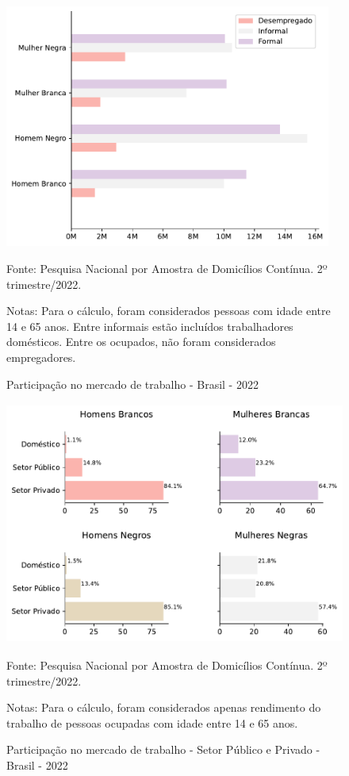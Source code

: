 \documentclass[12pt]{article}
\begin{document}
\begin{figure}[H]
    \centering
    \caption{Participação no mercado de trabalho - Brasil - 2022}
        \includegraphics[height=8cm]{../figures/emprego.pdf}
    \label{fig:employment}
    \begin{floatnotes}
        \item[Fonte:] Pesquisa Nacional por Amostra de Domicílios Contínua. 2º trimestre/2022.
        \item[Notas:] Para o cálculo, foram considerados pessoas com idade entre 14 e 65 anos. Entre informais estão incluídos trabalhadores domésticos. Entre os ocupados, não foram considerados empregadores.
    \end{floatnotes}
\end{figure}


\begin{figure}[H]
    \centering
    \caption{Participação no mercado de trabalho - Setor Público e Privado - Brasil - 2022}
        \includegraphics[height=8cm]{../figures/participation.pdf}
    \label{fig:participation}
    \begin{floatnotes}
        \item[Fonte:] Pesquisa Nacional por Amostra de Domicílios Contínua. 2º trimestre/2022.
        \item[Notas:] Para o cálculo, foram considerados apenas rendimento do trabalho de pessoas ocupadas com idade entre 14 e 65 anos.
    \end{floatnotes}
\end{figure}
\end{document}
